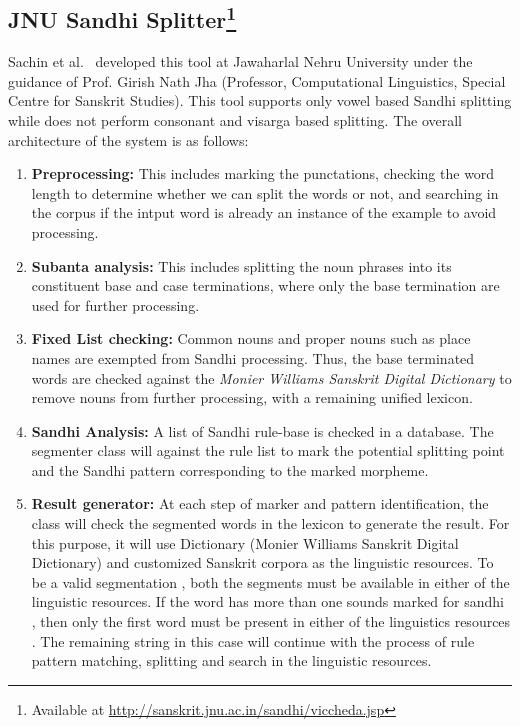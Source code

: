 \documentclass[11pt]{article}
\begin{document}
\subsection{JNU Sandhi Splitter\footnote{Available at \url{http://sanskrit.jnu.ac.in/sandhi/viccheda.jsp}}} Sachin et al.~\cite{sachin2007sandhi} developed this tool at Jawaharlal Nehru University under the guidance of Prof. Girish Nath Jha (Professor, Computational Linguistics, Special Centre for Sanskrit Studies). This tool supports only vowel based Sandhi splitting while does not perform consonant and visarga based splitting. The overall architecture of the system is as follows:



\begin{enumerate}
	
	\item \textbf{Preprocessing:}
	This includes marking the punctations, checking the word length to determine whether we can split the words or not, and searching in the corpus if the intput word is already an instance of the example to avoid processing.
	
	\item \textbf{Subanta analysis:}
	This includes splitting the noun phrases into its constituent base and case terminations, where only the base termination are used for further processing.
	
	\item \textbf{Fixed List checking:}
	Common nouns and proper nouns such as place names are exempted from Sandhi processing. Thus, the base terminated words are checked against the \emph{Monier Williams Sanskrit Digital Dictionary} to remove nouns from further processing, with a remaining unified lexicon.
	
	\item \textbf{Sandhi Analysis:}
	A list of Sandhi rule-base is checked in a database. The segmenter class will against the rule list to mark the potential splitting point and the Sandhi pattern corresponding to the marked morpheme.
	
	\item \textbf{Result generator:}
	At  each  step  of  marker  and  pattern  identification,  the  class  will  check  the  segmented  words  in  the  lexicon  to  generate  the  result.  For  this  purpose,  it  will  use  Dictionary (Monier Williams Sanskrit Digital Dictionary)  and  customized Sanskrit corpora as the linguistic resources. To be a valid segmentation , both  the segments must be available in either of the linguistic resources. If the word has more  than one sounds marked for  sandhi , then only the first word must be present in either of  the linguistics resources . The remaining string in this case will continue with the process  of rule pattern matching, splitting and search in the linguistic resources.
\end{enumerate}
\end{document}
